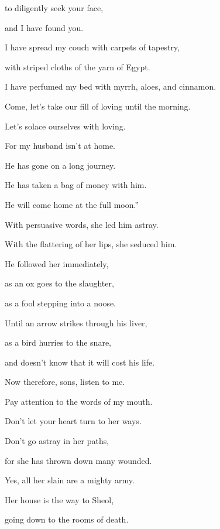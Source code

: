 {\par }{\QB to diligently seek your face,
\par }{\QB and I have found you.
\par }{\Q {}I have spread my couch with carpets of tapestry,
\par }{\QB with striped cloths of the yarn of Egypt.
\par }{\Q {}I have perfumed my bed with myrrh, aloes, and cinnamon.
\par }{\Q {}Come, let’s take our fill of loving until the morning.
\par }{\QB Let’s solace ourselves with loving.
\par }{\Q {}For my husband isn’t at home.
\par }{\QB He has gone on a long journey.
\par }{\Q {}He has taken a bag of money with him.
\par }{\QB He will come home at the full moon.”
\par }{\Q {}With persuasive words, she led him astray.
\par }{\QB With the flattering of her lips, she seduced him.
\par }{\Q {}He followed her immediately,
\par }{\QB as an ox goes to the slaughter,
\par }{\QB as a fool stepping into a noose.
\par }{\Q {}Until an arrow strikes through his liver,
\par }{\QB as a bird hurries to the snare,
\par }{\QB and doesn’t know that it will cost his life.
\par }{\BB \par }{\Q {}Now therefore, sons, listen to me.
\par }{\QB Pay attention to the words of my mouth.
\par }{\Q {}Don’t let your heart turn to her ways.
\par }{\QB Don’t go astray in her paths,
\par }{\Q {}for she has thrown down many wounded.
\par }{\QB Yes, all her slain are a mighty army.
\par }{\Q {}Her house is the way to Sheol,
\par }{\QB going down to the rooms of death.

}
